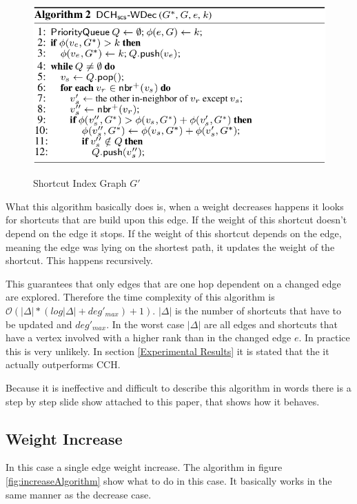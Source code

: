 \documentclass[twocolumn]{article}
\begin{document}
\begin{figure}[ht]
    \caption{Shortcut Index Graph $G'$}
    \centering
    \includegraphics[width=\linewidth]{decreaseAlgorithm}
    \label{fig:decreaseAlgorithm}
\end{figure}

What this algorithm basically does is, when a weight decreases happens it looks for shortcuts that are build upon this edge.
If the weight of this shortcut doesn't depend on the edge it stops. If the weight of this shortcut depends on the edge, 
meaning the edge was lying on the shortest path, it updates the weight of the shortcut. This happens recursively.

This guarantees that only edges that are one hop dependent on a changed edge are explored. Therefore the time complexity 
of this algorithm is $\mathcal{O}(\vert\Delta\vert  * (log \vert \Delta \vert + deg'_{max}) + 1)$.  $\vert\Delta\vert$ is the
number of shortcuts that have to be updated and $deg'_{max}$. 
In the worst case $\vert\Delta\vert$ are all edges and shortcuts that have a vertex involved with a higher rank than in the changed edge $e$.
In practice this is very unlikely. In section \ref{Experimental Results} it is stated that the it actually outperforms CCH.

Because it is ineffective and difficult to describe this algorithm in words there is a step by step slide show attached to this
paper, that shows how it behaves. 

\subsection{Weight Increase}
In this case a single edge weight increase. The algorithm in figure \ref{fig:increaseAlgorithm} 
show what to do in this case. It basically works in the same manner as the decrease case.
\end{document}
